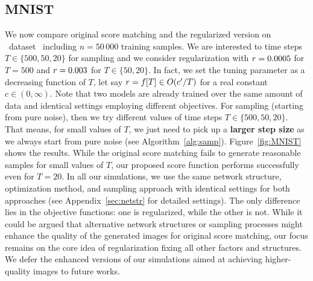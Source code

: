 \subsection{MNIST}\label{sec:mnist}
We now compare original score matching  and the regularized version on \mnist~dataset~\citep{LeCun1998} including $n=50\,000$ training samples. 
We are interested to time steps $T\in \{500,50,20\}$ for sampling and we consider regularization with $\textcolor{black}{r}=0.0005$ for $T=500$ and $\textcolor{black}{r}=0.003$ for $T\in \{50,20\}$.
In fact, we set the tuning parameter as a decreasing function of $T$, let say $\textcolor{black}{r}=f[T]\in O(c'/T)$ for a real constant $c\in (0,\infty)$.
Note that two models are already trained over the same amount of data and identical settings employing different objectives. 
For sampling (starting from pure noise), then we try different values of time steps $T\in \{500,50,20\}$. 
That means, for small values of $T$, we just need to pick up a \textbf{larger step size} as we always start from pure noise (see Algorithm~\ref{alg:samp}).
Figure~\ref{fig:MNIST} shows the results. While the original score matching fails to generate reasonable samples for small values of $T$, our proposed score function performs successfully even for $T=20$. 
In all our simulations, we use the same network structure, optimization method, and sampling approach with identical settings for both approaches (see Appendix~\ref{sec:netstr} for detailed settings). The only difference lies in the objective functions: one is regularized, while the other is not. While it could be argued that alternative network structures or sampling processes might enhance the quality of the generated images for original score matching, our focus remains on the core idea of regularization fixing all other factors and structures.  
We defer the enhanced versions of our simulations aimed at achieving higher-quality images to future works.

